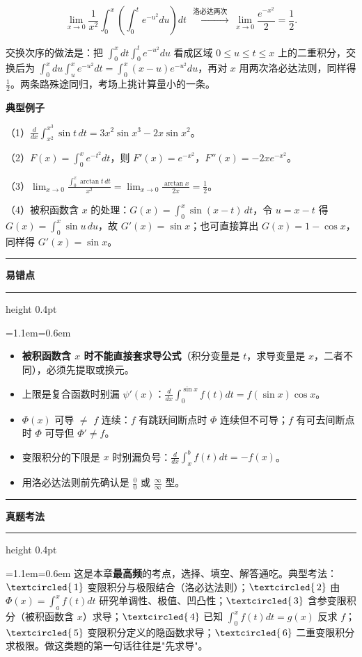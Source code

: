 \documentclass[11pt,openany,UTF8]{ctexbook}
\newcommand{\circled}[1]{\textcircled{\scriptsize\,#1}}
\newcommand{\callouthead}[2]{%
  \par\addvspace{7pt}\noindent
  {\color{#1}\rule[-0.15em]{3pt}{1.05em}}\hspace{0.5em}%
  {\bfseries\color{#1}#2}\par\nobreak\vspace{-0.35em}%
  {\color{rulesep}\hrule height 0.4pt}\nobreak\vspace{0.45em}%
  \begingroup\small\setlength{\parindent}{0pt}%
  \leftskip=1.1em\rightskip=0.6em\noindent\ignorespaces}
\newcommand{\calloutend}{\par\endgroup\addvspace{7pt}}
\newenvironment{callwarn}[1]{\callouthead{warnbar}{#1}}{\calloutend}
\newenvironment{callexam}[1]{\callouthead{exambar}{#1}}{\calloutend}
\begin{document}
\[\lim_{x\to0}\frac{1}{x^2}\int_0^x\left(\int_0^te^{-u^2}du\right)dt\ \xrightarrow{\ \text{洛必达两次}\ }\ \lim_{x\to0}\frac{e^{-x^2}}{2}=\frac{1}{2}.\]

交换次序的做法是：把 $\int_0^xdt\int_0^te^{-u^2}du$ 看成区域 $0\leq u\leq t\leq x$ 上的二重积分，交换后为 $\int_0^xdu\int_u^xe^{-u^2}dt=\int_0^x(x-u)e^{-u^2}du$，再对 $x$ 用两次洛必达法则，同样得 $\frac{1}{2}$。两条路殊途同归，考场上挑计算量小的一条。

\textbf{典型例子}

（1）$\displaystyle\frac{d}{dx}\int_{x^2}^{x^3}\sin t\,dt=3x^2\sin x^3-2x\sin x^2$。

（2）$F(x)=\int_0^xe^{-t^2}dt$，则 $F'(x)=e^{-x^2}$，$F''(x)=-2xe^{-x^2}$。

（3）$\displaystyle\lim_{x\to0}\frac{\int_0^x\arctan t\,dt}{x^2}=\lim_{x\to0}\frac{\arctan x}{2x}=\frac{1}{2}$。

（4）被积函数含 $x$ 的处理：$G(x)=\displaystyle\int_0^x\sin(x-t)\,dt$，令 $u=x-t$ 得 $G(x)=\int_0^x\sin u\,du$，故 $G'(x)=\sin x$；也可直接算出 $G(x)=1-\cos x$，同样得 $G'(x)=\sin x$。

\begin{callwarn}{易错点}
\begin{itemize}
\item \textbf{被积函数含 $x$ 时不能直接套求导公式}（积分变量是 $t$，求导变量是 $x$，二者不同），必须先提取或换元。
\item 上限是复合函数时别漏 $\psi'(x)$：$\frac{d}{dx}\int_0^{\sin x}f(t)dt=f(\sin x)\cos x$。
\item $\Phi(x)$ 可导 $\neq$ $f$ 连续：$f$ 有跳跃间断点时 $\Phi$ 连续但不可导；$f$ 有可去间断点时 $\Phi$ 可导但 $\Phi'\neq f$。
\item 变限积分的下限是 $x$ 时别漏负号：$\frac{d}{dx}\int_x^bf(t)dt=-f(x)$。
\item 用洛必达法则前先确认是 $\frac{0}{0}$ 或 $\frac{\infty}{\infty}$ 型。
\end{itemize}
\end{callwarn}

\begin{callexam}{真题考法}
这是本章\textbf{最高频}的考点，选择、填空、解答通吃。典型考法：$\circled{1}$ 变限积分与极限结合（洛必达法则）；$\circled{2}$ 由 $\Phi(x)=\int_a^xf(t)dt$ 研究单调性、极值、凹凸性；$\circled{3}$ 含参变限积分（被积函数含 $x$）求导；$\circled{4}$ 已知 $\int_0^x f(t)dt=g(x)$ 反求 $f$；$\circled{5}$ 变限积分定义的隐函数求导；$\circled{6}$ 二重变限积分求极限。做这类题的第一句话往往是"先求导"。

\end{callexam}
\end{document}
